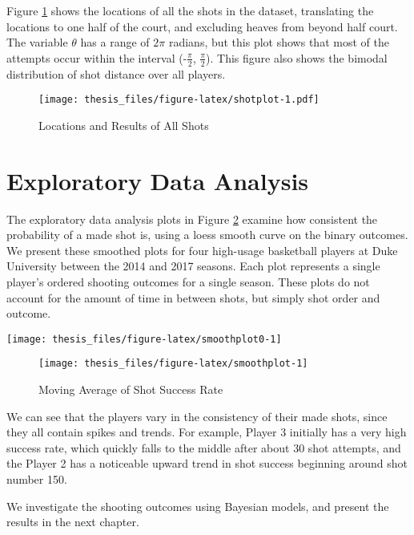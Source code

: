 \documentclass[12pt,twoside]{dukestatscithesis}
\theoremstyle{definition}
\theoremstyle{definition}
\theoremstyle{definition}
\theoremstyle{remark}
\begin{document}
\pagebreak

Figure \ref{fig:shotplot} shows the locations of all the shots in the
dataset, translating the locations to one half of the court, and
excluding heaves from beyond half court. The variable \(\theta\) has a
range of \(2\pi\) radians, but this plot shows that most of the attempts
occur within the interval (-\(\frac{\pi}{2}\), \(\frac{\pi}{2}\)). This
figure also shows the bimodal distribution of shot distance over all
players.
\begin{figure}[htbp]
\centering
\texttt{[image: thesis\_files/figure-latex/shotplot-1.pdf]}
\caption{\label{fig:shotplot}Locations and Results of All Shots}
\end{figure}
\section{Exploratory Data Analysis}\label{exploratory-data-analysis}

The exploratory data analysis plots in Figure \ref{fig:smoothplot}
examine how consistent the probability of a made shot is, using a loess
smooth curve on the binary outcomes. We present these smoothed plots for
four high-usage basketball players at Duke University between the 2014
and 2017 seasons. Each plot represents a single player's ordered
shooting outcomes for a single season. These plots do not account for
the amount of time in between shots, but simply shot order and outcome.
\begin{center}\texttt{[image: thesis\_files/figure-latex/smoothplot0-1]} \end{center}
\begin{figure}

{\centering \texttt{[image: thesis\_files/figure-latex/smoothplot-1]} 

}

\caption{Moving Average of Shot Success Rate}\label{fig:smoothplot}
\end{figure}
\pagebreak

We can see that the players vary in the consistency of their made shots,
since they all contain spikes and trends. For example, Player 3
initially has a very high success rate, which quickly falls to the
middle after about 30 shot attempts, and the Player 2 has a noticeable
upward trend in shot success beginning around shot number 150.

We investigate the shooting outcomes using Bayesian models, and present
the results in the next chapter.
\end{document}
